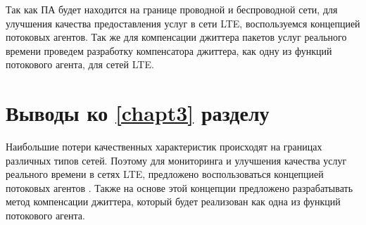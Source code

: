 Так как ПА будет находится на границе проводной и беспроводной сети, для улучшения качества предоставления услуг в сети LTE, воспользуемся концепцией потоковых агентов. Так же для компенсации джиттера пакетов услуг реального времени проведем разработку компенсатора джиттера, как одну из функций потокового агента, для сетей LTE.



\section{Выводы ко \ref{chapt3} разделу} \label{sect:concl3}


Наибольшие потери качественных характеристик происходят на границах различных типов сетей. Поэтому для мониторинга и улучшения качества услуг реального времени в сетях LTE, предложено воспользоваться концепцией потоковых агентов \cite{SAdouble_feedback,SArateOpt,SArealtime}. Также на основе этой концепции предложено разрабатывать метод компенсации джиттера, который будет реализован как одна из функций потокового агента.



